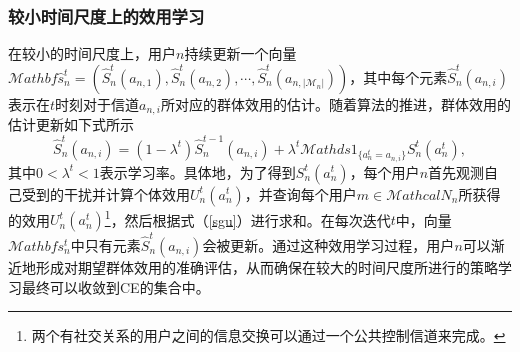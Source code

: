 \subsubsection{较小时间尺度上的效用学习}
在较小的时间尺度上，用户$n$持续更新一个向量$\mathcal{M}athbf{\hat{s}^t_n}=\left(\hat{S}^t_n(a_{n,1}),\hat{S}^t_n(a_{n,2}),\cdots,\hat{S}^t_n(a_{n,|\mathcal{M}_n|})\right)$，其中每个元素$\hat{S}^t_n(a_{n,i})$表示在$t$时刻对于信道$a_{n,i}$所对应的群体效用的估计。随着算法的推进，群体效用的估计更新如下式所示
\begin{equation}\label{estimation}
\hat{S}^t_n(a_{n,i})=(1-\lambda^t)\hat{S}^{t-1}_n(a_{n,i})+\lambda^t\mathcal{M}athds{1}_{\{a^t_n=a_{n,i}\}}S^t_n(a_n^t),
\end{equation}
其中$0<\lambda^t<1$表示学习率。具体地，为了得到$S^t_n(a^t_n)$，每个用户$n$首先观测自己受到的干扰并计算个体效用$U^t_n(a^t_n)$，并查询每个用户$m\in\mathcal{M}athcal{N}_n$所获得的效用$U^t_n(a^t_n)$\footnote{两个有社交关系的用户之间的信息交换可以通过一个公共控制信道来完成。}，然后根据式（\ref{sgu}）进行求和。在每次迭代$t$中，向量$\mathcal{M}athbf{s^t_n}$中只有元素$\hat{S}^t_n(a_{n,i})$会被更新。通过这种效用学习过程，用户$n$可以渐近地形成对期望群体效用的准确评估，从而确保在较大的时间尺度所进行的策略学习最终可以收敛到CE的集合中。
